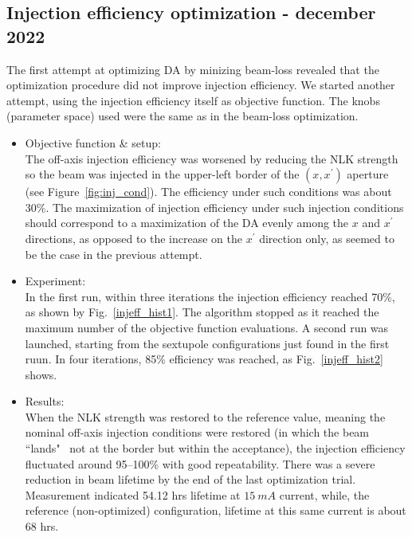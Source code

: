 \subsection{Injection efficiency optimization - december 2022}
The first attempt at optimizing DA by minizing beam-loss revealed that the optimization procedure did not improve injection efficiency. We started another attempt, using the injection efficiency itself as objective function. The knobs (parameter space) used were the same as in the beam-loss optimization.
\begin{itemize}
        \item Objective function \& setup:\\
        The off-axis injection efficiency was worsened by reducing the NLK strength
        so the beam was injected in the upper-left border of the  $(x,x^\prime)$ aperture (see Figure~\ref{fig:inj_cond}). The efficiency under such conditions was about 30\%. The maximization of injection efficiency under such injection conditions should correspond to a maximization of the DA evenly among the $x$ and $x^{\prime}$ directions, as opposed to the increase on the $x^\prime$ direction only, as seemed to be the case in the previous attempt.
        \item Experiment:\\
        In the first run, within three iterations the injection efficiency reached 70\%,  as shown by Fig.~\ref{injeff_hist1}. The algorithm stopped as it reached the maximum number of the objective function evaluations. A second run was launched, starting from the sextupole configurations just found in the first ruun. In four iterations, 85\% efficiency was reached, as Fig.~\ref{injeff_hist2} shows.
        \item Results:\\
        When the NLK strength was restored to the reference value, meaning the nominal off-axis injection conditions were restored (in which the beam ``lands"~ not at the border but within the acceptance), the injection efficiency fluctuated around 95--100\% with good repeatability. There was a severe reduction in beam lifetime by the end of the last optimization trial. Measurement indicated 54.12 hrs lifetime at $15~\unit{mA}$ current, while, the reference (non-optimized) configuration, lifetime at this same current is about 68 hrs.
    \end{itemize}
